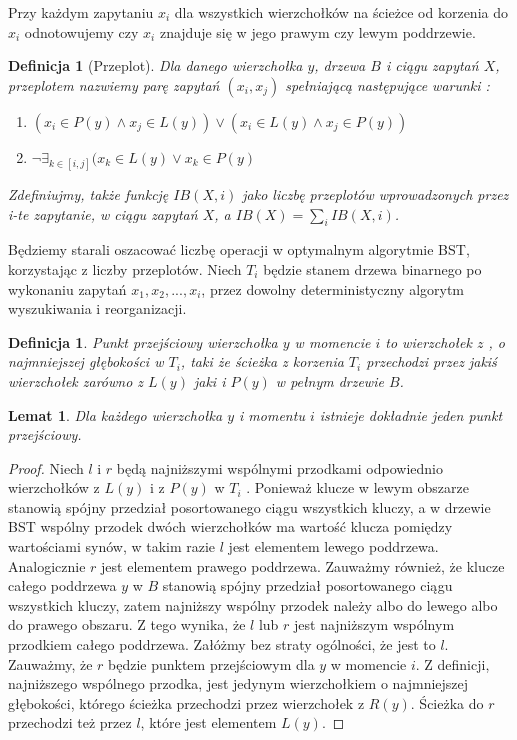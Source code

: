 \documentclass[declaration,shortabstract]{iithesis}
\newcounter{thm}[section]
\theoremstyle{thm}
\newtheorem{definition}[thm]{Definicja}
\theoremstyle{remark}
\theoremstyle{plain}
\theoremstyle{plain}
\theoremstyle{plain}
\newtheorem{lemma}[thm]{Lemat}
\begin{document}
Przy każdym zapytaniu \(x_i\) dla wszystkich wierzchołków na ścieżce od korzenia do \(x_i\) odnotowujemy czy \(x_i\) znajduje się w jego prawym czy lewym poddrzewie.  

\begin{definition}[Przeplot] 
Dla danego wierzchołka \(y\), drzewa \(B\) i ciągu zapytań \(X\), przeplotem nazwiemy parę zapytań \((x_i, x_j)\) spełniającą następujące warunki : \\ 
\begin{enumerate} 
\item{\( ( x_i \in P(y) \wedge x_j \in L(y)) \vee ( x_i \in L(y) \wedge x_j \in P(y))\)} 
\item{\( \neg \exists_{k \in [i, j]}( x_k \in  L(y) \vee x_k \in P(y) \)} 
\end{enumerate}  

Zdefiniujmy, także funkcję \(IB(X, i)\) jako liczbę przeplotów wprowadzonych przez i-te zapytanie, w ciągu zapytań $X$, a \(IB(X) = \sum_i IB(X, i)\). \end{definition}  

Będziemy starali oszacować liczbę operacji w optymalnym algorytmie BST, korzystając z liczby przeplotów. Niech \(T_i\) będzie stanem drzewa binarnego po wykonaniu zapytań \( x_1, x_2, ..., x_i\), przez dowolny deterministyczny algorytm wyszukiwania i reorganizacji.  

\begin{definition} Punkt przejściowy wierzchołka $y$ w momencie $i$ to wierzchołek $z$ , o najmniejszej  głębokości w \( T_i\), taki że ścieżka z korzenia $T_i$ przechodzi przez jakiś wierzchołek zarówno z $L(y)$ jaki i $P(y)$ w pełnym drzewie $B$. \end{definition}  

\begin{lemma} 
Dla każdego wierzchołka $y$ i momentu $i$ istnieje dokładnie jeden punkt przejściowy. 
\end{lemma} 
\begin{proof} 
Niech $l$ i $r$ będą najniższymi wspólnymi przodkami odpowiednio wierzchołków z $L(y)$ i  z $P(y)$ w $T_i$ . Ponieważ klucze w lewym obszarze stanowią spójny przedział posortowanego ciągu wszystkich kluczy, a w drzewie BST wspólny przodek dwóch wierzchołków ma wartość klucza pomiędzy wartościami synów, w takim razie $l$ jest elementem lewego poddrzewa. Analogicznie $r$ jest elementem prawego poddrzewa. Zauważmy również, że klucze całego poddrzewa $y$ w $B$ stanowią spójny przedział posortowanego ciągu wszystkich kluczy, zatem najniższy wspólny przodek należy albo do lewego albo do prawego obszaru. Z tego wynika, że $l$ lub $r$ jest najniższym wspólnym przodkiem całego poddrzewa. Załóżmy bez straty ogólności, że jest to $l$. Zauważmy, że $r$ będzie punktem przejściowym dla $y$ w momencie $i$. Z definicji, najniższego wspólnego przodka, jest jedynym wierzchołkiem o najmniejszej głębokości, którego ścieżka przechodzi przez wierzchołek z $R(y)$. Ścieżka do $r$ przechodzi też przez $l$, które jest elementem $L(y)$. \end{proof}  
\end{document}

